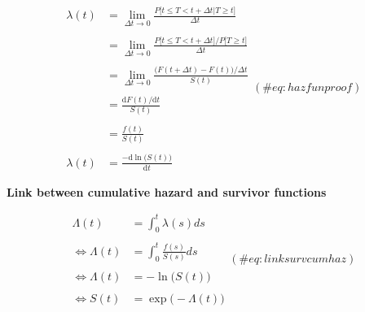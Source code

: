 \documentclass[
]{book}
\begin{document}
\begin{equation}    
  \begin{aligned}
  \lambda(t) & = \lim_{\Delta t \to 0} \frac{P\big[t \leq T < t + \Delta t | T \geq t \big]}{\Delta t} \\\\
  & = \lim_{\Delta t \to 0} \frac{P\big[t \leq T < t + \Delta t \big] / P\big[T \geq t  \big]}{\Delta t} \\\\
  & = \lim_{\Delta t \to 0} \frac{\big(F(t+\Delta t)-F(t)\big) / \Delta t}{S(t)} \\\\
  & = \frac{\text{d} F(t) / \text{d} t}{S(t)} \\\\
  & = \frac{f(t)}{S(t)} \\\\
  \lambda(t) & = \frac{-\text{d} \ln \big(S(t)\big)}{\text{d} t}
  \end{aligned}
  (\#eq:hazfunproof)
\end{equation}

\textbf{Link between cumulative hazard and survivor functions}

\begin{equation}
  \begin{aligned}
  \Lambda(t)      & = \int_{0}^{t} \lambda(s)ds \\\\
  \iff \Lambda(t) & = \int_{0}^{t} \frac{f(s)}{S(s)}ds \\\\
  \iff \Lambda(t) & = -\ln \big(S(t)\big) \\\\
  \iff S(t)       & = \exp \big(-\Lambda(t)\big)
  \end{aligned}
  (\#eq:linksurvcumhaz)
\end{equation}

  
\end{document}
